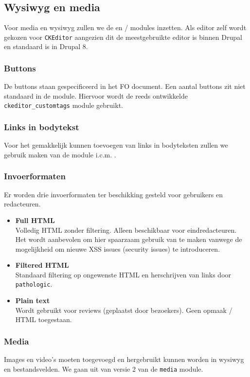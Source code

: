 \subsection{Wysiwyg en media}\label{wysiwyg}

Voor media en wysiwyg zullen we de  en  /  modules inzetten. Als editor zelf wordt gekozen voor \texttt{CKEditor} aangezien dit de meestgebruikte editor is binnen Drupal en standaard is in Drupal 8.

\subsubsection{Buttons}

De buttons staan gespecificeerd in het FO document.
Een aantal buttons zit niet standaard in de  module. Hiervoor wordt de reeds ontwikkelde \texttt{ckeditor\_customtags} module gebruikt.

\subsubsection{Links in bodytekst}

Voor het gemakkelijk kunnen toevoegen van links in bodyteksten zullen we gebruik maken van de  module i.c.m. .

\subsubsection{Invoerformaten}\label{invoerformaten}

Er worden drie invoerformaten ter beschikking gesteld voor gebruikers en redacteuren.

\begin{itemize}
\item \textbf{Full HTML} \\
Volledig HTML zonder filtering. Alleen beschikbaar voor eindredacteuren. Het wordt aanbevolen om hier spaarzaam gebruik van te maken vanwege de mogelijkheid om nieuwe XSS issues (security issues) te introduceren.
\item \textbf{Filtered HTML} \\
Standaard filtering op ongewenste HTML en herschrijven van links door \texttt{pathologic}.
\item \textbf{Plain text} \\
Wordt gebruikt voor reviews (geplaatst door bezoekers). Geen opmaak / HTML toegestaan.
\end{itemize}

\subsubsection{Media}\label{media}

Images en video's moeten toegevoegd en hergebruikt kunnen worden in wysiwyg en bestandsvelden.
We gaan uit van versie 2 van de \texttt{media} module.



